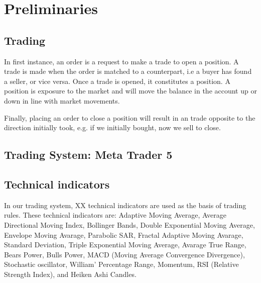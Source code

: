 \section{Preliminaries}

\subsection{Trading}
In first instance, an order is a request to make a trade to open a position.
A trade is made when the order is matched to a counterpart, i.e a buyer has found a seller, or vice versa.
Once a trade is opened, it constitutes a position. A position is exposure to the market and will move the balance in the account up or down in line with market movements.

Finally, placing an order to close a position will result in an trade opposite to the direction initially took, e.g. if we initially bought, now we sell to close.

\subsection{Trading System: Meta Trader 5}

\subsection{Technical indicators}
In our trading system, XX technical indicators are used as the basis of trading rules. These technical indicators are: Adaptive Moving Average, Average Directional Moving Index, Bollinger Bands, Double Exponential Moving Average, Envelope Moving Avarage, Parabolic SAR, Fractal Adaptive Moving Avarage, Standard Deviation, Triple Exponential Moving Average, Avarage True Range, Bears Power, Bulls Power, MACD (Moving Average Convergence Divergence), Stochastic oscillator, William' Percentage Range, Momentum, RSI (Relative Strength Index), and Heiken Ashi Candles.
